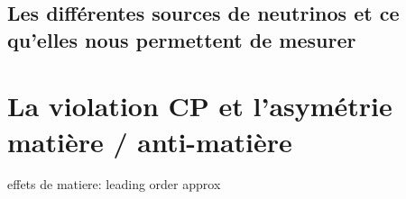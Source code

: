         \subsection{Les différentes sources de neutrinos et ce qu'elles nous permettent de mesurer}
    
    \section{La violation CP et l'asymétrie matière / anti-matière}\label{sec::violation}
        effets de matiere: \cite{Wolfenstein1978,Mikheyev1986}
        leading order approx \cite{Marciano2006}